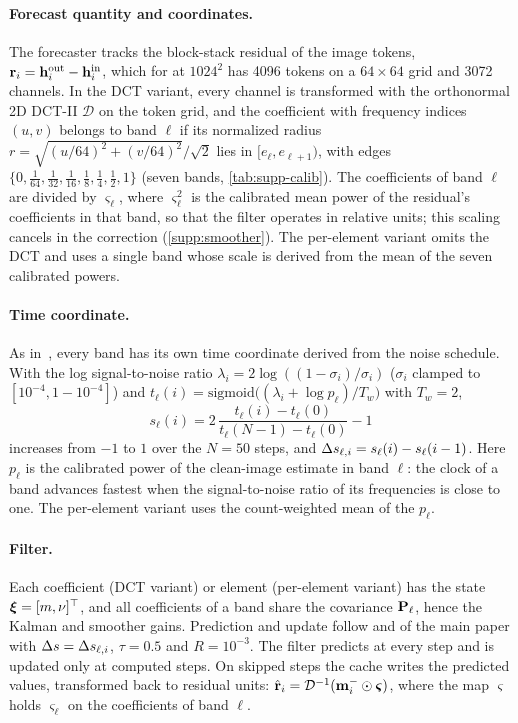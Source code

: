 \paragraph{Forecast quantity and coordinates.}
The forecaster tracks the block-stack residual of the image tokens, $\mathbf{r}_i=\mathbf{h}^{\mathrm{out}}_i-\mathbf{h}^{\mathrm{in}}_i$, which for \flux at
$1024^2$ has 4096 tokens on a $64{\times}64$ grid and 3072 channels. In the DCT variant, every channel is transformed
with the orthonormal 2D DCT-II $\mathcal D$ on the token grid, and the coefficient with frequency indices $(u,v)$
belongs to band $\ell$ if its normalized radius $r=\sqrt{(u/64)^2+(v/64)^2}/\sqrt2$ lies in $[e_\ell,e_{\ell+1})$, with
edges $\{0,\frac1{64},\frac1{32},\frac1{16},\frac18,\frac14,\frac12,1\}$ (seven bands, \cref{tab:supp-calib}). The
coefficients of band $\ell$ are divided by $\varsigma_\ell$, where $\varsigma^2_\ell$ is the calibrated mean power of the
residual's coefficients in that band, so that the filter operates in relative units; this scaling cancels in the correction
(\cref{supp:smoother}). The per-element variant omits the DCT and uses a single band whose scale is derived from the mean of
the seven calibrated powers.

\paragraph{Time coordinate.}
As in~\cite{rajabi2026speckcast}, every band has its own time coordinate derived from the noise schedule.
With the log signal-to-noise ratio $\lambda_i=2\log((1-\sigma_i)/\sigma_i)$ ($\sigma_i$ clamped to
$[10^{-4},1-10^{-4}]$) and $t_\ell(i)=\mathrm{sigmoid}\big((\lambda_i+\log p_\ell)/T_w\big)$ with $T_w=2$,
\begin{equation}
  s_\ell(i)=2\,\frac{t_\ell(i)-t_\ell(0)}{t_\ell(N{-}1)-t_\ell(0)}-1
  \label{eq:supp-time}
\end{equation}
increases from $-1$ to $1$ over the $N=50$ steps, and $\Delta s_{\ell,i}=s_\ell(i)-s_\ell(i-1)$. Here $p_\ell$ is the calibrated power of the
clean-image estimate in band $\ell$: the clock of a band advances fastest when the signal-to-noise ratio of its
frequencies is close to one. The per-element variant uses the count-weighted mean of the $p_\ell$.

\paragraph{Filter.}
Each coefficient (DCT variant) or element (per-element variant) has the state $\bm{\xi}=[m,\nu]^\top$, and all
coefficients of a band share the covariance $\mathbf{P}_\ell$, hence the Kalman and smoother gains. Prediction and update
follow  and  of the main paper with $\Delta s=\Delta s_{\ell,i}$, $\tau=0.5$ and
$R=10^{-3}$. The filter predicts at every step and is updated only at computed steps. On skipped steps the cache writes
the predicted values, transformed back to residual units: $\hat{\mathbf{r}}_i=\mathcal D^{-1}(\mathbf m^{-}_i\odot
\boldsymbol\varsigma)$, where the map $\boldsymbol\varsigma$ holds $\varsigma_\ell$ on the coefficients of band $\ell$.


